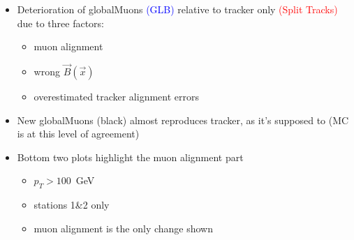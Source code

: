 \documentclass[compress]{beamer}
\begin{document}
\begin{frame}
\begin{columns}

\begin{itemize}
\item Deterioration of \mbox{globalMuons\hspace{-0.5 cm}} \textcolor{blue}{(GLB)} relative to tracker only \textcolor{red}{(Split Tracks)} due to three factors:
\begin{itemize}
\item \scriptsize muon alignment
\item \scriptsize wrong $\vec{B}(\vec{x})$
\item \scriptsize overestimated tracker alignment errors
\end{itemize}

\item New globalMuons (black) almost reproduces tracker, as it's supposed to (MC is at this level of agreement)

\item Bottom two plots highlight the muon alignment part
\begin{itemize}
\item \scriptsize $p_T > 100$~GeV
\item \scriptsize stations 1\&2 only
\item \scriptsize muon alignment is the only change shown
\end{itemize}
\end{itemize}
\end{columns}
\end{frame}
\end{document}
